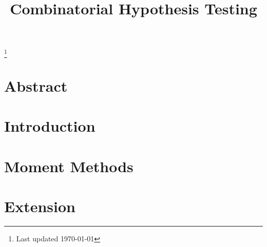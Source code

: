 \documentclass[10pt, oneside]{article}
\theoremstyle{definition}
\theoremstyle{remark}
\numberwithin{figure}{section}
\numberwithin{equation}{subsection}
\begin{document}
\thispagestyle{empty}
\title{Combinatorial Hypothesis Testing}



\maketitle
\tableofcontents
\let\thefootnote\relax\footnote{Last updated \today}
\addtocounter{footnote}{-1}\let\thefootnote\svthefootnote

\section{Abstract}

\section{Introduction}

\section{Moment Methods}

\section{Extension}
\end{document}
